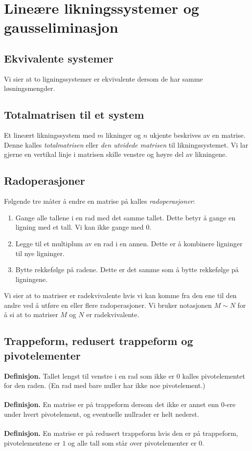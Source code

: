 \documentclass{article}
\begin{document}
\clearpage
\section{Lineære likningssystemer og gausseliminasjon}


\subsection{Ekvivalente systemer}
Vi sier at to ligningssystemer er ekvivalente dersom
de har samme løsningsmengder.


\subsection{Totalmatrisen til et system}
Et lineært likningssystem med $m$ likninger og $n$ ukjente beskrives av en matrise. Denne kalles \textit{totalmatrisen} eller \textit{den utvidede matrisen} til likningssystemet. Vi lar gjerne en vertikal linje i matrisen skille venstre og høyre del av likningene.


\subsection{Radoperasjoner}
Følgende tre måter å endre en matrise på kalles \textit{radoperasjoner}:
\begin{enumerate}
    \item Gange alle tallene i en rad med det samme tallet. Dette betyr å gange en ligning med et tall. Vi kan ikke gange med 0.
    \item Legge til et multiplum av en rad i en annen. Dette er å kombinere ligninger til nye ligninger.
    \item Bytte rekkefølge på radene. Dette er det samme som å bytte rekkefølge på ligningene.
\end{enumerate}
Vi sier at to matriser er radekvivalente hvis vi kan komme fra den ene til den andre ved å utføre en eller flere radoperasjoner. Vi bruker notasjonen $M \sim N$ for å si at to matriser $M$ og $N$ er radekvivalente.


\subsection{Trappeform, redusert trappeform og pivotelementer}
\textbf{Definisjon.} Tallet lengst til venstre i en rad som ikke er $0$ kalles pivotelementet for den raden. (En rad med bare nuller har ikke noe pivotelement.)
\\\\
\textbf{Definisjon.} En matrise er på trappeform dersom det ikke er annet enn $0$-ere under hvert pivotelement, og eventuelle nullrader er helt nederst.
\\\\
\textbf{Definisjon.} En matrise er på redusert trappeform hvis den er på trappeform, pivotelementene er $1$ og alle tall som står over pivotelementer er $0$.
\end{document}
